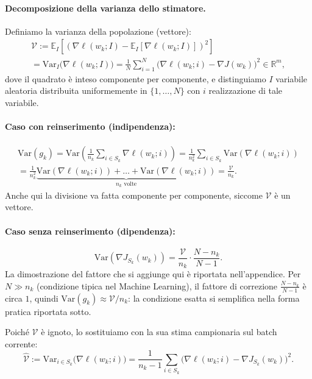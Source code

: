 \documentclass[italian, a4paper, twoside, binding=6mm]{sapthesis}
\newcommand{\Var}{\mathrm{Var}}
\begin{document}
\paragraph{Decomposizione della varianza dello stimatore.}

Definiamo la varianza della popolazione (vettore):
\[
\begin{gathered}
\mathcal{V}
:= \mathbb{E}_{I}\left[ \left( \nabla \ell(w_k; I) - \mathbb{E}_{I}[\nabla \ell(w_k; I)] \right)^{2} \right] \\
= \Var_{I}\bigl(\nabla \ell(w_k; I)\bigr) 
= \frac{1}{N}\sum_{i=1}^{N}\bigl(\nabla \ell(w_k; i) - \nabla J(w_k)\bigr)^2 \in \mathbb{R}^m,
\end{gathered}
\]
dove il quadrato è inteso componente per componente, e distinguiamo $I$ variabile aleatoria distribuita uniformemente in $\{1,\dots,N\}$ con $i$ realizzazione di tale variabile.

\paragraph{Caso con reinserimento (indipendenza):}
\[
\begin{gathered}
  \Var(g_k) = \Var\!\left(\frac{1}{n_k}\sum_{i\in S_k}\nabla\ell(w_k;i)\right)
  = \frac{1}{n_k^2}\sum_{i\in S_k}\Var(\nabla\ell(w_k;i)) \\
  = \frac{1}{n_k^2}\underbrace{\Var(\nabla\ell(w_k;i))+\dots+\Var(\nabla\ell(w_k;i))}_{n_k \text{ volte}}
  = \frac{\mathcal{V}}{n_k}.
\end{gathered}
\]
Anche qui la divisione va fatta componente per componente, siccome $\mathcal{V}$ è un vettore.

\paragraph{Caso senza reinserimento (dipendenza):}
\[
  \Var\!\left(\nabla J_{S_k}(w_k)\right) = \frac{\mathcal{V}}{n_k}\cdot\frac{N-n_k}{N-1}.
\]
La dimostrazione del fattore che si aggiunge qui è riportata nell'appendice.
Per $N \gg n_k$ (condizione tipica nel Machine Learning), il fattore di correzione $\frac{N-n_k}{N-1}$ è circa $1$, quindi $\Var(g_k) \approx \mathcal{V}/n_k$: la condizione esatta si semplifica nella forma pratica riportata sotto.

Poich\'e $\mathcal{V}$ \`e ignoto, lo sostituiamo con la sua stima campionaria sul batch corrente:
\[
  \widehat{\mathcal{V}} := \Var_{i \in S_k}\bigl(\nabla \ell(w_k;i)\bigr)
  = \frac{1}{n_k-1}\sum_{i\in S_k}\bigl(\nabla \ell(w_k;i) - \nabla J_{S_k}(w_k)\bigr)^2.
\]
\end{document}
